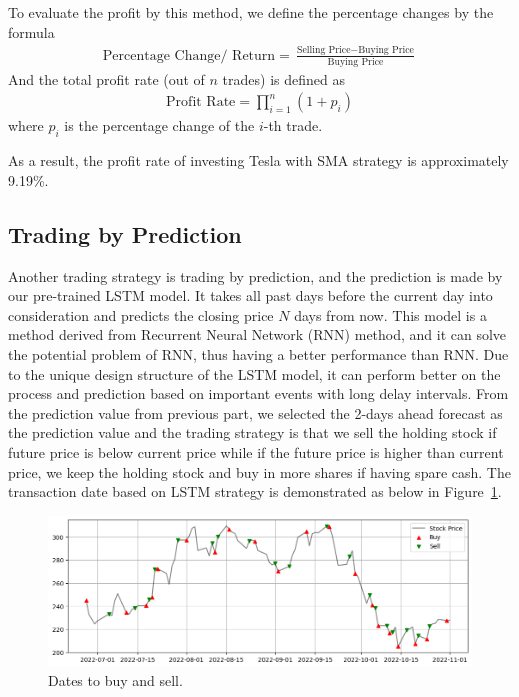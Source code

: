 \documentclass[a4paper, 11pt]{my-elegantpaper}
\begin{document}
To evaluate the profit by this method, we define the percentage changes by the formula
\begin{align*}
    \text{Percentage Change/ Return} = \frac{\text{Selling Price} - \text{Buying Price}}{\text{Buying Price}}
\end{align*}
And the total profit rate (out of $n$ trades) is defined as
\begin{align*}
    \text{Profit Rate} = \prod_{i=1}^n (1 +  p_i)
\end{align*}
where $p_i$ is the percentage change of the $i$-th trade.

As a result, the profit rate of investing Tesla with SMA strategy is approximately 9.19\%.


\subsection{Trading by Prediction}

Another trading strategy is trading by prediction, and the prediction is made by our pre-trained LSTM model. It takes all past days before the current day into consideration and predicts the closing price $N$ days from now. This model is a method derived from Recurrent Neural Network (RNN) method, and it can solve the potential problem of RNN, thus having a better performance than RNN. Due to the unique design structure of the LSTM model, it can perform better on the process and prediction based on important events with long delay intervals. From the prediction value from previous part, we selected the 2-days ahead forecast as the prediction value and the trading strategy is that we sell the holding stock if future price is below current price while if the future price is higher than current price, we keep the holding stock and buy in more shares if having spare cash. The transaction date based on LSTM strategy is demonstrated as below in Figure~\ref{fig:5}.

\begin{figure}[H]
    \centering
    \includegraphics[scale=0.5]{figures/trade-by-pred.png}
    \caption{Dates to buy and sell.}
    \label{fig:5}
\end{figure}
\end{document}

